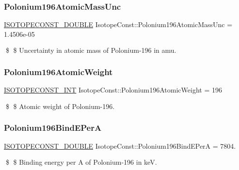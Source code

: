\subsubsection{\texorpdfstring{Polonium196\+Atomic\+Mass\+Unc}{Polonium196AtomicMassUnc}}
{\footnotesize\ttfamily \mbox{\hyperlink{group___isotope_const-_macros_ga8f45a7272ce02c0b4c65c44636ed719a}{I\+S\+O\+T\+O\+P\+E\+C\+O\+N\+S\+T\+\_\+\+D\+O\+U\+B\+LE}} Isotope\+Const\+::\+Polonium196\+Atomic\+Mass\+Unc = 1.\+4506e-\/05}

\$ \$ Uncertainty in atomic mass of Polonium-\/196 in amu. \mbox{\label{group___isotope_const-_polonium-_po196_gafa6f4b0a600e8eefd743fb07d5097986}} 
\subsubsection{\texorpdfstring{Polonium196\+Atomic\+Weight}{Polonium196AtomicWeight}}
{\footnotesize\ttfamily \mbox{\hyperlink{group___isotope_const-_macros_ga5f18360b3e99483a35c32d789e62621c}{I\+S\+O\+T\+O\+P\+E\+C\+O\+N\+S\+T\+\_\+\+I\+NT}} Isotope\+Const\+::\+Polonium196\+Atomic\+Weight = 196}

\$ \$ Atomic weight of Polonium-\/196. \mbox{\label{group___isotope_const-_polonium-_po196_gafe90e0cf0a13f5769c172b4726cb1169}} 
\subsubsection{\texorpdfstring{Polonium196\+Bind\+E\+PerA}{Polonium196BindEPerA}}
{\footnotesize\ttfamily \mbox{\hyperlink{group___isotope_const-_macros_ga8f45a7272ce02c0b4c65c44636ed719a}{I\+S\+O\+T\+O\+P\+E\+C\+O\+N\+S\+T\+\_\+\+D\+O\+U\+B\+LE}} Isotope\+Const\+::\+Polonium196\+Bind\+E\+PerA = 7804.}

\$ \$ Binding energy per A of Polonium-\/196 in keV. \mbox{\label{group___isotope_const-_polonium-_po196_gaab29ab71c7fd5fad0df0b482e99c963b}} 
